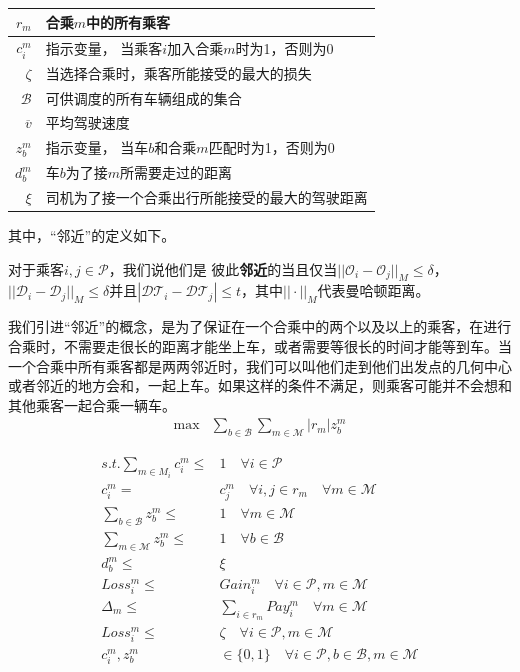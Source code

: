 \begin{longtable}{|r|l|}
        \hline
        $r_m$ & 合乘$m$中的所有乘客\\
        \hline
        $c_i^m$ & 指示变量， 当乘客$i$加入合乘$m$时为1，否则为0\\
        \hline
        $\zeta$ & 当选择合乘时，乘客所能接受的最大的损失\\
        \hline
        $\mathcal{B}$ & 可供调度的所有车辆组成的集合\\
        \hline
        $\overline{v}$ & 平均驾驶速度\\
        \hline
        $z_b^m$ & 指示变量， 当车$b$和合乘$m$匹配时为1，否则为0\\
        \hline
        $d_b^m$ & 车$b$为了接$m$所需要走过的距离\\
        \hline
        $\xi$ & 司机为了接一个合乘出行所能接受的最大的驾驶距离\\
\hline
\end{longtable}
其中，“邻近”的定义如下。
\begin{definition}[邻近]
对于乘客$i,j \in \mathcal{P}$，我们说他们是 彼此\textbf{邻近}的当且仅当$||\mathcal{O}_i - \mathcal{O}_j||_M \leq \delta $，$||\mathcal{D}_i - \mathcal{D}_j||_M \leq \delta$并且$|\mathcal{DT}_i- \mathcal{DT}_j| \leq t$，其中$||\cdot||_M$代表曼哈顿距离。
\label{def:close}
\end{definition}

\par
我们引进“邻近”的概念，是为了保证在一个合乘中的两个以及以上的乘客，在进行合乘时，不需要走很长的距离才能坐上车，或者需要等很长的时间才能等到车。当一个合乘中所有乘客都是两两邻近时，我们可以叫他们走到他们出发点的几何中心或者邻近的地方会和，一起上车。如果这样的条件不满足，则乘客可能并不会想和其他乘客一起合乘一辆车。
\[
\begin{aligned}
  \max & \sum_{b\in\mathcal{B}}\sum_{m\in\mathcal{M}} |r_m|z_b^m 
\end{aligned}
\]

\begin{align}
    s.t. \sum_{m\in M_i} c_i^m \leq&  1 \quad \forall i\in \mathcal{P}  \label{eq:c1}\\
    c_i^m =  & c_j^m \quad \forall i,j \in r_m \quad \forall m\in\mathcal{M} \label{eq:c2}\\
    \sum_{b\in\mathcal{B}}z_b^m \leq& 1 \quad \forall m\in\mathcal{M} \label{eq:c3}\\
    \sum_{m\in\mathcal{M}}z_b^m \leq& 1 \quad \forall b\in \mathcal{B} \label{eq:c4}\\
    d_b^m \leq& \xi \label{eq:c5}\\
    Loss_i^m \leq & Gain_i^m\quad \forall i\in\mathcal{P}, m \in \mathcal{M} \label{eq:c6}\\
    \Delta_m  \leq & \sum_{i\in r_m} Pay_i^m \quad \forall m \in \mathcal{M} \label{eq:c7}\\
    Loss_i^m \leq& \zeta \quad \forall i\in\mathcal{P},m\in\mathcal{M} \label{eq:c8}\\
    c_i^m, z_b^m&\in\{0,1\}\quad \forall i\in \mathcal{P}, b\in \mathcal{B}, m\in\mathcal{M} \label{eq:c9}
\end{align}

